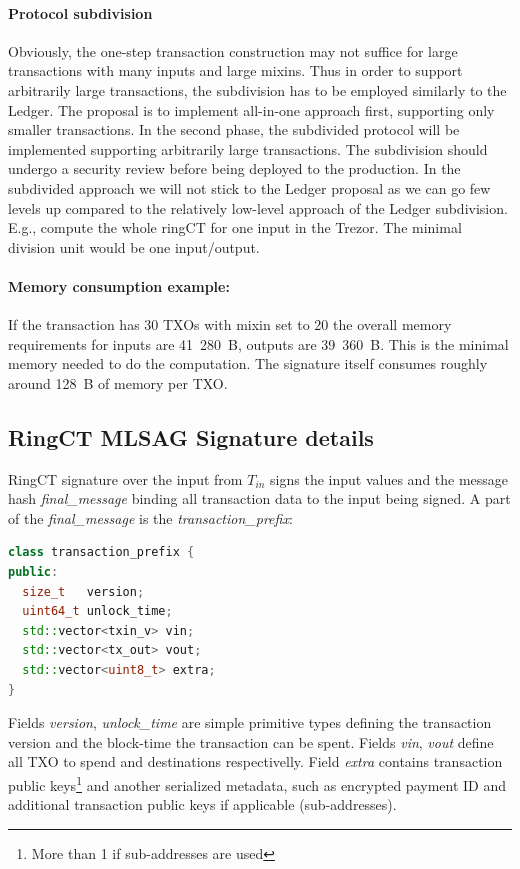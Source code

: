\documentclass[]{article}
\begin{document}
\paragraph{Protocol subdivision }

Obviously, the one-step transaction construction may not suffice for large transactions with many inputs and large mixins. Thus in order to support arbitrarily large transactions, the subdivision has to be employed similarly to the Ledger. The proposal is to implement all-in-one approach first, supporting only smaller transactions. In the second phase, the subdivided protocol will be implemented supporting arbitrarily large transactions. The subdivision should undergo a security review before being deployed to the production. In the subdivided approach we will not stick to the Ledger proposal as we can go few levels up compared to the relatively low-level approach of the Ledger subdivision. E.g., compute the whole ringCT for one input in the Trezor. The minimal division unit would be one input/output.

\paragraph{Memory consumption example:}
If the transaction has 30 TXOs with mixin set to 20 the overall memory requirements for inputs are 41~280~B, outputs are 39~360~B. This is the minimal memory needed to do the computation. The signature itself consumes roughly around 128~B of memory per TXO.

\subsection{RingCT MLSAG Signature details}

RingCT signature over the input from $T_{in}$ signs the input values and the message hash \emph{final\_message} binding all transaction data to the input being signed. A part of the \emph{final\_message} is the \emph{transaction\_prefix}:

\begin{lstlisting}[language=c++]
class transaction_prefix {
public:
  size_t   version;
  uint64_t unlock_time;  
  std::vector<txin_v> vin;
  std::vector<tx_out> vout;
  std::vector<uint8_t> extra;
}
\end{lstlisting}

Fields \emph{version}, \emph{unlock\_time} are simple primitive types defining the transaction version and the block-time the transaction can be spent. Fields \emph{vin}, \emph{vout} define all TXO to spend and destinations respectivelly. Field \emph{extra} contains transaction public keys\footnote{More than 1 if sub-addresses are used} and another serialized metadata, such as encrypted payment ID and additional transaction public keys if applicable (sub-addresses).
\end{document}
